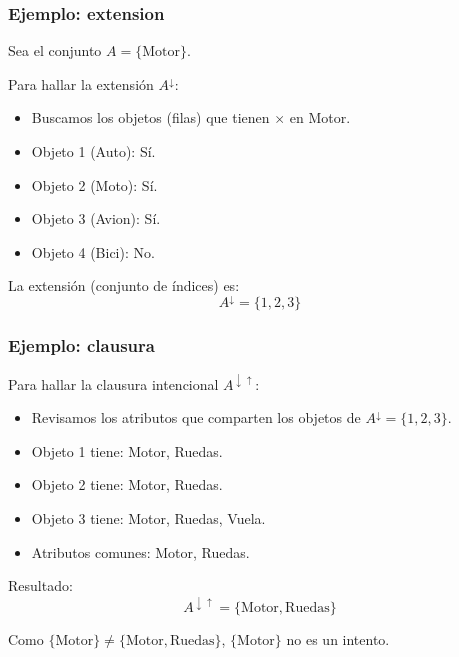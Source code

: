 \documentclass{beamer}
\begin{document}
  \begin{frame}
    \frametitle{Ejemplo: extension}
    Sea el conjunto $A = \{\text{Motor}\}$.

    \bigskip
    \pause

    Para hallar la extensión $A^\downarrow$:
    \pause
    \begin{itemize}[<+->]
      \item Buscamos los objetos (filas) que
        tienen $\times$ en Motor.
      \item Objeto 1 (Auto): Sí.
      \item Objeto 2 (Moto): Sí.
      \item Objeto 3 (Avion): Sí.
      \item Objeto 4 (Bici): No.
    \end{itemize}

    \bigskip
    \pause

    La extensión (conjunto de índices) es:
    \[
      A^\downarrow = \{1, 2, 3\}
    \]
  \end{frame}

  \begin{frame}
    \frametitle{Ejemplo: clausura}
    Para hallar la clausura intencional $A^{\downarrow\uparrow}$:

    \bigskip
    \pause

    \begin{itemize}[<+->]
      \item Revisamos los atributos que comparten
        los objetos de $A^\downarrow = \{1, 2, 3\}$.
      \item Objeto 1 tiene: Motor, Ruedas.
      \item Objeto 2 tiene: Motor, Ruedas.
      \item Objeto 3 tiene: Motor, Ruedas, Vuela.
      \item Atributos comunes: Motor, Ruedas.
    \end{itemize}

    \bigskip
    \pause

    Resultado:
    \[
      A^{\downarrow\uparrow} = \{\text{Motor}, \text{Ruedas}\}
    \]

    \pause
    Como $\{\text{Motor}\} \neq \{\text{Motor}, \text{Ruedas}\}$,
    $\{\text{Motor}\}$ no es un intento.
  \end{frame}
\end{document}
